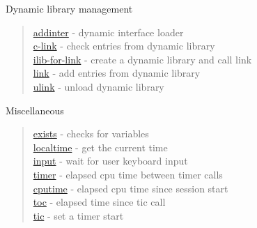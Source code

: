 Dynamic library management
\begin{quote}
\noindent 
\hyperlink{addinter}{addinter} - dynamic interface loader\\
\hyperlink{c_link}{c-link} - check entries from dynamic library \\
\hyperlink{ilib_for_link}{ilib-for-link} - create a dynamic library and call link \\
\hyperlink{link}{link} - add entries from dynamic library \\
\hyperlink{ulink}{ulink} - unload dynamic library \\
\end{quote}

Miscellaneous 
\begin{quote}
\noindent 
\hyperlink{exists}{exists} - {checks for variables}\\
\hyperlink{localtime}{localtime} - {get the current time}\\
\hyperlink{input}{input} - {wait for user keyboard input} \\
\hyperlink{timer}{timer} - {elapsed cpu time between timer calls} \\
\hyperlink{cputime}{cputime} - {elapsed cpu time since session start} \\
\hyperlink{toc}{toc} - {elapsed time since tic call}\\
\hyperlink{tic}{tic} - {set a timer start}\\
\end{quote}





 
  
  

 

 
 

 
 
 
 
 
